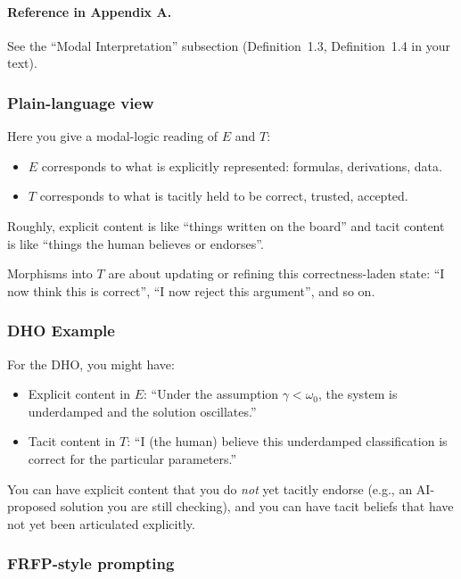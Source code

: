 \paragraph{Reference in Appendix A.}
See the ``Modal Interpretation'' subsection (Definition~1.3, Definition~1.4 in your text).

\subsubsection*{Plain-language view}

Here you give a modal-logic reading of $E$ and $T$:

\begin{itemize}
 \item $E$ corresponds to what is explicitly represented: formulas, derivations, data.
 \item $T$ corresponds to what is tacitly held to be correct, trusted, accepted.
\end{itemize}

Roughly, explicit content is like ``things written on the board'' and tacit content is like
``things the human believes or endorses''.

Morphisms into $T$ are about updating or refining this correctness-laden state:
``I now think this is correct'', 
``I now reject this argument'', 
and so on.

\subsubsection*{DHO Example}

For the DHO, you might have:

\begin{itemize}
 \item Explicit content in $E$: 
 ``Under the assumption $\gamma < \omega_0$, the system is underdamped and the solution oscillates.''
 \item Tacit content in $T$: 
 ``I (the human) believe this underdamped classification is correct for the particular parameters.''
\end{itemize}

You can have explicit content that you do \emph{not} yet tacitly endorse (e.g., an AI-proposed
solution you are still checking), and you can have tacit beliefs that have not yet been articulated
explicitly.

\subsubsection*{FRFP-style prompting}

